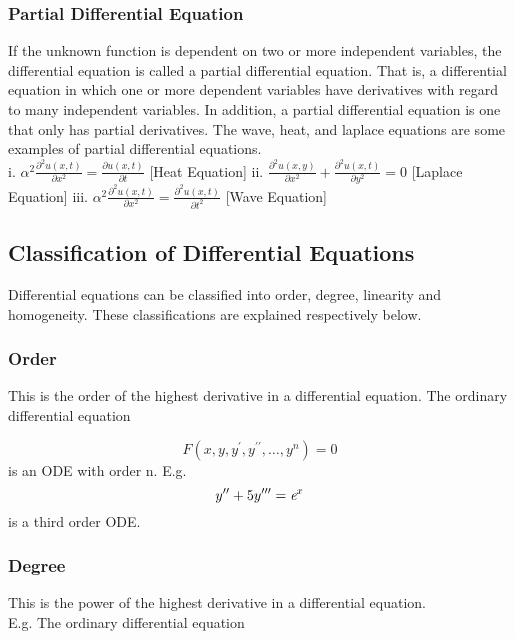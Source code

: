 \documentclass[12pt]{report}
\begin{document}
\subsubsection{Partial Differential Equation} 
If the unknown function is dependent on two or more independent variables, the differential equation is called a partial differential equation. That is, a differential equation in which one or more dependent variables have derivatives with regard to many independent variables. In addition, a partial differential equation is one that only has partial derivatives. The wave, heat, and laplace equations are some examples of partial differential equations. \\
\smallskip
i. $\alpha^{2}\frac{\partial^{2}u(x,t)}{\partial x^{2}} =  \frac{\partial u(x,t)}{\partial t} $    [Heat Equation]
ii. $\frac{\partial^{2}u(x,y)}{\partial x^{2}} + \frac{\partial^{2}u(x,t)}{\partial y^{2}} = 0 $   [Laplace Equation]  
iii. $\alpha^{2}\frac{\partial^{2}u(x,t)}{\partial x^{2}} = \frac{\partial^{2}u(x,t)}{\partial t^{2}} $   [Wave Equation]

	
\subsection{Classification of Differential Equations} 
Differential equations can be classified into order, degree, linearity and homogeneity. These classifications are explained respectively below.
\subsubsection{Order} 
This is the order of the highest derivative in a differential equation. The ordinary differential equation

\begin{equation}
 F(x,y,y^\prime,y^{\prime\prime},\dots,y^n ) = 0
\end{equation} is an ODE with order n. E.g. 
\begin{equation}
y^{\prime\prime} + 5y^{\prime\prime\prime} = \textit e^x
\end{equation}  is a third order ODE.

\subsubsection{Degree}
This is the power of the highest derivative in a differential equation. \\ E.g. The ordinary differential equation
\end{document}

